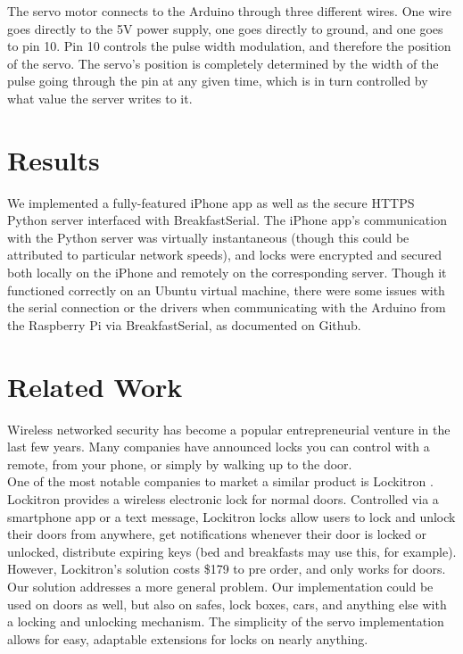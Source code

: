 \documentclass[10pt]{article}
\begin{document}
\begin{multicols}{2}
The servo motor connects to the Arduino through three different wires. One wire goes directly to the 5V power supply, one goes directly to ground, and one goes to pin 10. Pin 10 controls the pulse width modulation, and therefore the position of the servo. The servo's position is completely determined by the width of the pulse going through the pin at any given time, which is in turn controlled by what value the server writes to it. \\


\section{Results}
We implemented a fully-featured iPhone app as well as the secure HTTPS Python server interfaced with BreakfastSerial. The iPhone app's communication with the Python server was virtually instantaneous (though this could be attributed to particular network speeds), and locks were encrypted and secured both locally on the iPhone and remotely on the corresponding server. Though it functioned correctly on an Ubuntu virtual machine, there were some issues \cite{breakfastserialissue} with the serial connection or the drivers when communicating with the Arduino from the Raspberry Pi via BreakfastSerial, as documented on Github. 

\section{Related Work}
Wireless networked security has become a popular entrepreneurial venture in the last few years. Many companies have announced locks you can control with a remote, from your phone, or simply by walking up to the door. \\

One of the most notable companies to market a similar product is Lockitron \cite{lockitron}. Lockitron provides a wireless electronic lock for normal doors. Controlled via a smartphone app or a text message, Lockitron locks allow users to lock and unlock their doors from anywhere, get notifications whenever their door is locked or unlocked, distribute expiring keys (bed and breakfasts may use this, for example). \\

However, Lockitron's solution costs \$179 to pre order, and only works for doors. Our solution addresses a more general problem. Our implementation could be used on doors as well, but also on safes, lock boxes, cars, and anything else with a locking and unlocking mechanism. The simplicity of the servo implementation allows for easy, adaptable extensions for locks on nearly anything.\\


\end{multicols}
\end{document}
